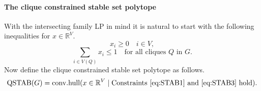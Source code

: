 \paragraph{The clique constrained stable set polytope} With the intersecting family LP in mind it is natural to start with the following inequalities for $x \in \mathbb{R}^V$.
%
\begin{equation}\label{eq:STAB1}
x_i \geq 0 \quad i \in V,
\end{equation}
%
%
%
\begin{equation}\label{eq:STAB3}
\sum_{i \in V(Q)} x_i \leq 1 \quad \textrm{for all cliques } Q \textrm{ in } G.
\end{equation}
%
Now define the clique constrained stable set polytope as follows.
%
\begin{equation*}
\textrm{QSTAB}(G) = \textrm{conv.hull}( x \in \mathbb{R}^V \mid \textrm{Constraints } \eqref{eq:STAB1} \textrm{ and } \eqref{eq:STAB3} \textrm{ hold} ).
\end{equation*}
